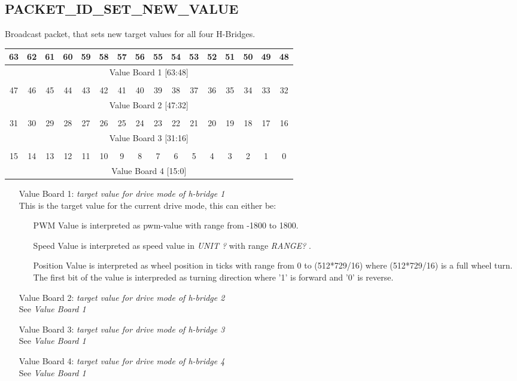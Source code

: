 \documentclass{article}
\begin{document}
\subsection{PACKET\_ID\_SET\_NEW\_VALUE}
Broadcast packet, that sets new target values for all four H-Bridges.\\
\begin{tabular} { c c c c c c c c c c c c c c c c}
  63&62&61&60&59&58&57&56&55&54&53&52&51&50&49&48\\
  \hline
  \multicolumn{16}{|c|}{Value Board 1 [63:48]} \\ 
  \hline
  \multicolumn{16}{c}{} \\
  47&46&45&44&43&42&41&40&39&38&37&36&35&34&33&32\\
  \hline
  \multicolumn{16}{|c|}{Value Board 2 [47:32]} \\ 
  \hline
  \multicolumn{16}{c}{} \\
  31&30&29&28&27&26&25&24&23&22&21&20&19&18&17&16\\
  \hline
  \multicolumn{16}{|c|}{Value Board 3 [31:16]} \\ 
  \hline
  \multicolumn{16}{c}{} \\
  15&14&13&12&11&10&9&8&7&6&5&4&3&2&1&0\\
  \hline
  \multicolumn{16}{|c|}{Value Board 4 [15:0]} \\ 
  \hline
\end{tabular}
\begin{itemize}
  \item[Value Board 1: ] {\it target value for drive mode of h-bridge 1}\\
    This is the target value for the current drive mode, this can
    either be:
    \begin{itemize}
      \item[PWM]
        Value is interpreted as pwm-value with range from -1800 to
        1800.
      \item[Speed]
        Value is interpreted as speed value in {\em UNIT ?} with range
        {\em RANGE?} .
      \item[Position]
        Value is interpreted as wheel position in ticks with range
        from 0 to (512*729/16) where (512*729/16) is a full wheel
        turn. The first bit of the value is interpreded as turning
        direction where '1' is forward and '0' is reverse.
    \end{itemize}

  \item[Value Board 2: ] {\it target value for drive mode of h-bridge 2}\\
    See {\em Value Board 1}
    
  \item[Value Board 3: ] {\it target value for drive mode of h-bridge 3}\\
    See {\em Value Board 1}
    
  \item[Value Board 4: ] {\it target value for drive mode of h-bridge 4}\\
    See {\em Value Board 1}

\end{itemize}
\end{document}
